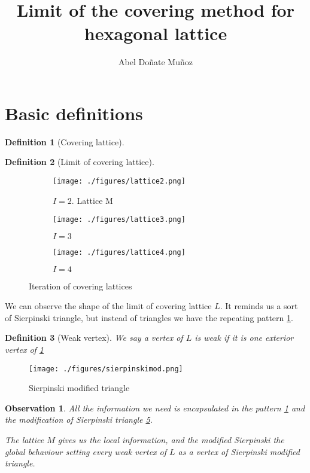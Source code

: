 \documentclass[leqno]{article}
\title{Limit of the covering method for hexagonal lattice}
\author{Abel Doñate Muñoz}
\date{}
\newtheorem*{definition}{Definition}
\newtheorem*{observation}{Observation}
\begin{document}
\maketitle
\tableofcontents
\newpage

\section{Basic definitions}
\begin{definition}[Covering lattice]

\end{definition}

\begin{definition}[Limit of covering lattice]

\end{definition}


\begin{figure}[h!]
     \centering
     \begin{subfigure}[b]{0.3\textwidth}
         \centering
         \texttt{[image: ./figures/lattice2.png]}
         \caption{$I=2$. Lattice M}
         \label{fig:I2}
     \end{subfigure}
     \hfill
     \begin{subfigure}[b]{0.3\textwidth}
         \centering
         \texttt{[image: ./figures/lattice3.png]}
         \caption{$I=3$}
         \label{fig:3}
     \end{subfigure}
     \hfill
     \begin{subfigure}[b]{0.3\textwidth}
         \centering
         \texttt{[image: ./figures/lattice4.png]}
         \caption{$I=4$}
         \label{fig:five over x}
     \end{subfigure}
        \caption{Iteration of covering lattices}
        \label{fig:4}
\end{figure}


We can observe the shape of the limit of covering lattice $L$. It reminds us a sort of Sierpinski triangle, but instead of triangles we have the repeating pattern \ref{fig:I2}.

\begin{definition}[Weak vertex] We say a vertex of $L$ is weak if it is one exterior vertex of \ref{fig:I2} 
\end{definition}

\begin{figure}[h!]
    \centering 
    \texttt{[image: ./figures/sierpinskimod.png]}
    \caption{Sierpinski modified triangle}
    \label{fig:sier}
\end{figure}

\begin{observation}All the information we need is encapsulated in the pattern  \ref{fig:I2} and the modification of Sierpinski triangle \ref{fig:sier}.

The lattice $M$ gives us the local information, and the modified Sierpinski the global behaviour setting every weak vertex of $L$ as a vertex of Sierpinski modified triangle.
\end{observation}
\end{document}
